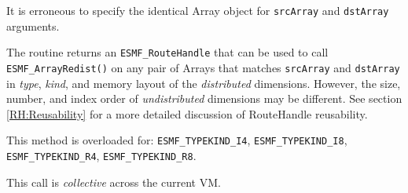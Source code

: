    It is erroneous to specify the identical Array object for {\tt srcArray} and
   {\tt dstArray} arguments. 
  
     The routine returns an {\tt ESMF\_RouteHandle} that can be used to call 
     {\tt ESMF\_ArrayRedist()} on any pair of Arrays that matches 
     {\tt srcArray} and {\tt dstArray} in {\em type}, {\em kind}, and 
     memory layout of the {\em distributed} dimensions. However, the size,
     number, and index order of {\em undistributed} dimensions may be different.
     See section \ref{RH:Reusability} for a more detailed discussion of
     RouteHandle reusability.
  
   This method is overloaded for:\newline
   {\tt ESMF\_TYPEKIND\_I4}, {\tt ESMF\_TYPEKIND\_I8},\newline 
   {\tt ESMF\_TYPEKIND\_R4}, {\tt ESMF\_TYPEKIND\_R8}.
   \newline
    
   This call is {\em collective} across the current VM.  
  
